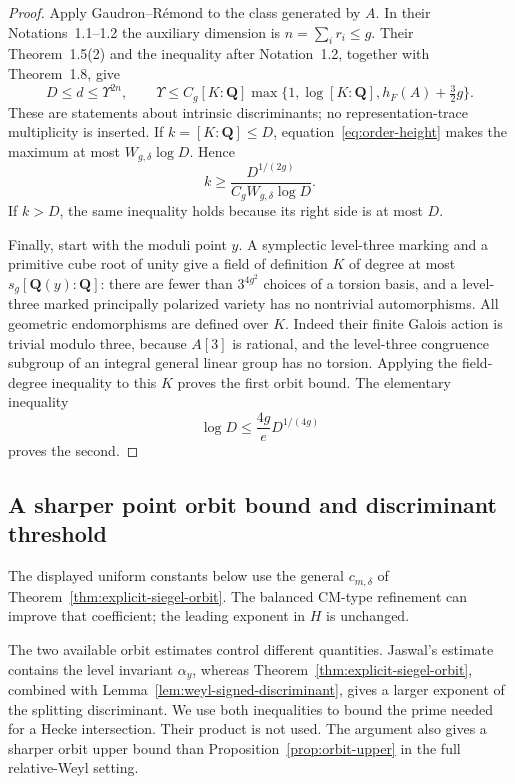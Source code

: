 \documentclass[11pt]{article}
\theoremstyle{definition}
\theoremstyle{remark}
\newcommand{\Q}{\mathbf Q}
\begin{document}
\begin{proof}
Apply Gaudron--R\'emond to the class generated by $A$.
In their Notations~1.1--1.2 the auxiliary dimension is
$n=\sum_i r_i\leq g$.
Their Theorem~1.5(2) and the inequality after Notation~1.2,
together with Theorem~1.8, give
\[
 D\leq d\leq\Upsilon^{2n},\qquad
 \Upsilon\leq C_g[K:\Q]
          \max\{1,\log[K:\Q],h_F(A)+\tfrac32g\}.
\]
These are statements about intrinsic discriminants; no
representation-trace multiplicity is inserted.
If $k=[K:\Q]\leq D$, equation~\eqref{eq:order-height}
makes the maximum at most $W_{g,\delta}\log D$.
Hence
\[
 k\geq\frac{D^{1/(2g)}}{C_gW_{g,\delta}\log D}.
\]
If $k>D$, the same inequality holds because its right side
is at most $D$.

Finally, start with the moduli point $y$.  A symplectic
level-three marking and a primitive cube root of unity give
a field of definition $K$ of degree at most
$s_g[\Q(y):\Q]$: there are fewer than $3^{4g^2}$ choices
of a torsion basis, and a level-three marked principally
polarized variety has no nontrivial automorphisms.
All geometric endomorphisms are defined over $K$.
Indeed their finite Galois action is trivial modulo three,
because $A[3]$ is rational, and the level-three congruence
subgroup of an integral general linear group has no torsion.
Applying the field-degree inequality to this $K$ proves
the first orbit bound.  The elementary inequality
\[
 \log D\leq\frac{4g}{e}D^{1/(4g)}
\]
proves the second.
\end{proof}

\subsection{A sharper point orbit bound and discriminant threshold}
\label{subsec:hybrid-point-forcing}

The displayed uniform constants below use the general
$c_{m,\delta}$ of Theorem~\ref{thm:explicit-siegel-orbit}.
The balanced CM-type refinement can improve that coefficient;
the leading exponent in $H$ is unchanged.


The two available orbit estimates control different quantities.
Jaswal's estimate contains the level invariant $\alpha_y$, whereas
Theorem~\ref{thm:explicit-siegel-orbit}, combined with
Lemma~\ref{lem:weyl-signed-discriminant}, gives a larger exponent of
the splitting discriminant.  We use both inequalities to bound the
prime needed for a Hecke intersection.  Their product is not used.
The argument also gives a sharper orbit upper bound than
Proposition~\ref{prop:orbit-upper} in the full relative-Weyl setting.
\end{document}
